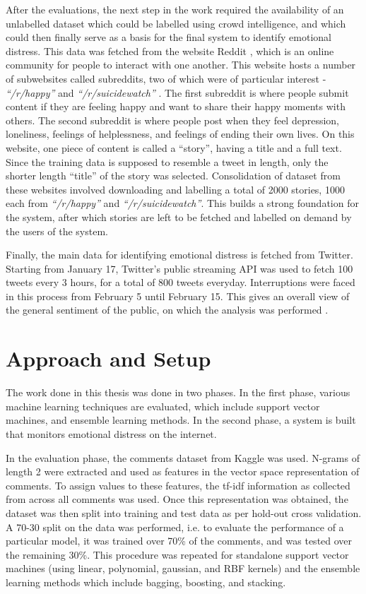 After the evaluations, the next step in the work required the availability of an unlabelled dataset which could be labelled using crowd intelligence, and which could then finally serve as a basis for the final system to identify emotional distress. This data was fetched from the website Reddit \cite{reddit}, which is an online community for people to interact with one another. This website hosts a number of subwebsites called subreddits, two of which were of particular interest - \emph{``/r/happy''} \cite{reddit_happy} and \emph{``/r/suicidewatch''} \cite{reddit_suicidewatch}. The first subreddit is where people submit content if they are feeling happy and want to share their happy moments with others. The second subreddit is where people post when they feel depression, loneliness, feelings of helplessness, and feelings of ending their own lives. On this website, one piece of content is called a ``story'', having a title and a full text. Since the training data is supposed to resemble a tweet in length, only the shorter length ``title'' of the story was selected. Consolidation of dataset from these websites involved downloading and labelling a total of 2000 stories, 1000 each from \emph{``/r/happy''} and \emph{``/r/suicidewatch''}. This builds a strong foundation for the system, after which stories are left to be fetched and labelled on demand by the users of the system.

Finally, the main data for identifying emotional distress is fetched from Twitter. Starting from January 17, Twitter's public streaming API \cite{twitter_streaming_api} was used to fetch 100 tweets every 3 hours, for a total of 800 tweets everyday. Interruptions were faced in this process from February 5 until February 15. This gives an overall view of the general sentiment of the public, on which the analysis was performed .

\section{Approach and Setup}
The work done in this thesis was done in two phases. In the first phase, various machine learning techniques are evaluated, which include support vector machines, and ensemble learning methods. In the second phase, a system is built that monitors emotional distress on the internet.

In the evaluation phase, the comments dataset from Kaggle \cite{kaggle} was used. N-grams of length 2 were extracted and used as features in the vector space representation of comments. To assign values to these features, the tf-idf information as collected from across all comments was used. Once this representation was obtained, the dataset was then split into training and test data as per hold-out cross validation. A 70-30 split on the data was performed, i.e. to evaluate the performance of a particular model, it was trained over 70\% of the comments, and was tested over the remaining 30\%. This procedure was repeated for standalone support vector machines (using linear, polynomial, gaussian, and RBF kernels) and the ensemble learning methods which include bagging, boosting, and stacking.

